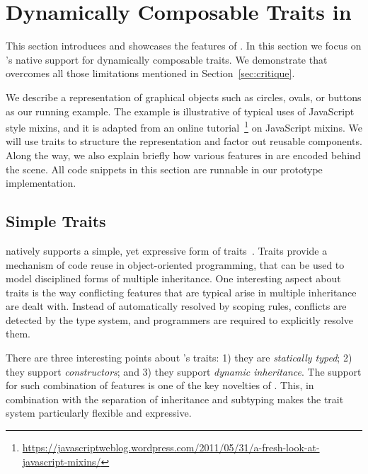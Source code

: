 
\section{Dynamically Composable Traits in \name}
\label{sec:traits}


This section introduces and showcases the features of \name. 
In this section we focus on \name's native support
for dynamically composable traits. We demonstrate that \name overcomes all those
limitations mentioned in Section~\ref{sec:critique}.

We describe a representation of graphical objects such as circles, ovals, or
buttons as our running example. The example is illustrative of typical
uses of JavaScript style mixins, and it is adapted from an online
tutorial~\footnote{\url{https://javascriptweblog.wordpress.com/2011/05/31/a-fresh-look-at-javascript-mixins/}}
on JavaScript mixins.
We will use traits to structure the representation and factor out reusable
components. Along the way, we also explain briefly how various features in \name
are encoded behind the scene. All code snippets in this section are runnable in
our prototype implementation.

\subsection{Simple Traits}

\name natively supports a simple, yet expressive form of
traits~\cite{scharli2003traits}.  Traits provide a mechanism of code
reuse in object-oriented programming, that can be used to model
disciplined forms of multiple inheritance. One interesting aspect
about traits is the way conflicting features that are typical arise in
multiple inheritance are dealt with. Instead of automatically resolved
by scoping rules, conflicts are detected by the type system, and
programmers are required to explicitly resolve them.

There are three interesting points about \name's traits: 1) they are
\emph{statically typed}; 2) they support \emph{constructors}; and 3)
they support \emph{dynamic inheritance}. The support for such
combination of features is one of the key novelties of \name. This, in
combination with the separation of inheritance and subtyping makes the
trait system particularly flexible and expressive.

